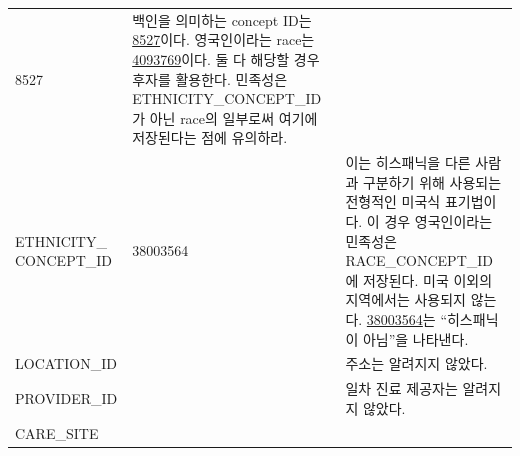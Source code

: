 \documentclass[10.5pt]{book}
\theoremstyle{definition}
\theoremstyle{definition}
\theoremstyle{definition}
\theoremstyle{remark}
\begin{document}
\begin{longtable}[]{@{}lll@{}}
\begin{minipage}[t]{0.16\columnwidth}
8527\strut
\end{minipage} & \begin{minipage}[t]{0.48\columnwidth}\raggedright\strut
백인을 의미하는 concept ID는
\href{http://athena.ohdsi.org/search-terms/terms/8527}{8527}이다.
영국인이라는 race는
\href{http://athena.ohdsi.org/search-terms/terms/4093769}{4093769}이다.
둘 다 해당할 경우 후자를 활용한다. 민족성은 ETHNICITY\_CONCEPT\_ID가
아닌 race의 일부로써 여기에 저장된다는 점에 유의하라.\strut
\end{minipage}\tabularnewline
\begin{minipage}[t]{0.28\columnwidth}\raggedright\strut
ETHNICITY\_ CONCEPT\_ID\strut
\end{minipage} & \begin{minipage}[t]{0.16\columnwidth}\raggedright\strut
38003564\strut
\end{minipage} & \begin{minipage}[t]{0.48\columnwidth}\raggedright\strut
이는 히스패닉을 다른 사람과 구분하기 위해 사용되는 전형적인 미국식
표기법이다. 이 경우 영국인이라는 민족성은 RACE\_CONCEPT\_ID에 저장된다.
미국 이외의 지역에서는 사용되지 않는다.
\href{http://athena.ohdsi.org/search-terms/terms/38003564}{38003564}는
``히스패닉이 아님''을 나타낸다.\strut
\end{minipage}\tabularnewline
\begin{minipage}[t]{0.28\columnwidth}\raggedright\strut
LOCATION\_ID\strut
\end{minipage} & \begin{minipage}[t]{0.16\columnwidth}\raggedright\strut
\strut
\end{minipage} & \begin{minipage}[t]{0.48\columnwidth}\raggedright\strut
주소는 알려지지 않았다.\strut
\end{minipage}\tabularnewline
\begin{minipage}[t]{0.28\columnwidth}\raggedright\strut
PROVIDER\_ID\strut
\end{minipage} & \begin{minipage}[t]{0.16\columnwidth}\raggedright\strut
\strut
\end{minipage} & \begin{minipage}[t]{0.48\columnwidth}\raggedright\strut
일차 진료 제공자는 알려지지 않았다.\strut
\end{minipage}\tabularnewline
\begin{minipage}[t]{0.28\columnwidth}\raggedright\strut
CARE\_SITE\strut
\end{minipage} & \begin{minipage}[t]{0.16\columnwidth}\raggedright\strut

\end{minipage}
\end{longtable}
\end{document}
